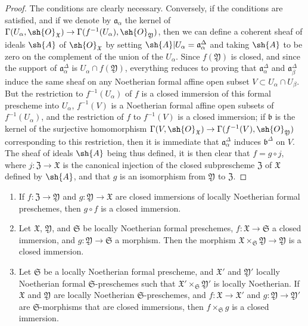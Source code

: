 \begin{proof}
The conditions are clearly necessary.
Conversely, if the conditions are satisfied, and if we denote by $\mathfrak{a}_\alpha$ the kernel of $\Gamma(U_\alpha,\sh{O}_\mathfrak{X})\to\Gamma(f^{-1}(U_\alpha),\sh{O}_\mathfrak{Y})$, then we can define a coherent sheaf of ideals $\sh{A}$ of $\sh{O}_\mathfrak{X}$ by setting $\sh{A}|U_\alpha=\mathfrak{a}_\alpha^\Delta$ and taking $\sh{A}$ to be zero on the complement of the union of the $U_\alpha$.
Since $f(\mathfrak{Y})$ is closed, and since the support of $\mathfrak{a}_\alpha^\Delta$ is $U_\alpha\cap f(\mathfrak{Y})$, everything reduces to proving that $\mathfrak{a}_\alpha^\Delta$ and $\mathfrak{a}_\beta^\Delta$ induce the same sheaf on any Noetherian formal affine open subset $V\subset U_\alpha\cap U_\beta$.
But the restriction to $f^{-1}(U_\alpha)$ of $f$ is a closed immersion of this formal prescheme into $U_\alpha$, $f^{-1}(V)$ is a Noetherian formal affine open subsets of $f^{-1}(U_\alpha)$, and the restriction of $f$ to $f^{-1}(V)$ is a closed immersion;
if $\mathfrak{b}$ is the kernel of the surjective homomorphism $\Gamma(V,\sh{O}_\mathfrak{X})\to\Gamma(f^{-1}(V),\sh{O}_\mathfrak{Y})$ corresponding to this restriction, then it is immediate  that $\mathfrak{a}_\alpha^\Delta$ induces $\mathfrak{b}^\Delta$ on $V$.
The sheaf of ideals $\sh{A}$ being thus defined, it is then clear that $f=g\circ j$, where $j:\mathfrak{Z}\to\mathfrak{X}$ is the canonical injection of the closed subprescheme $\mathfrak{Z}$ of $\mathfrak{X}$ defined by $\sh{A}$, and that $g$ is an isomorphism from $\mathfrak{Y}$ to $\mathfrak{Z}$.
\end{proof}

\begin{proposition}[10.14.5]
\label{I.10.14.5}
\medskip\noindent
\begin{enumerate}
  \item[\rm{(i)}] If $f:\mathfrak{Z}\to\mathfrak{Y}$ and $g:\mathfrak{Y}\to\mathfrak{X}$ are closed immersions of locally Noetherian formal preschemes, then $g\circ f$ is a closed immersion.
  \item[\rm{(ii)}] Let $\mathfrak{X}$, $\mathfrak{Y}$, and $\mathfrak{S}$ be locally Noetherian formal preschemes, $f:\mathfrak{X}\to\mathfrak{S}$ a closed immersion, and $g:\mathfrak{Y}\to\mathfrak{S}$ a morphism.
    Then the morphism $\mathfrak{X}\times_\mathfrak{S}\mathfrak{Y}\to\mathfrak{Y}$ is a closed immersion.
  \item[\rm{(iii)}] Let $\mathfrak{S}$ be a locally Noetherian formal prescheme, and $\mathfrak{X}'$ and $\mathfrak{Y}'$ locally Noetherian formal $\mathfrak{S}$-preschemes such that $\mathfrak{X}'\times_\mathfrak{S}\mathfrak{Y}'$ is locally Noetherian.
    If $\mathfrak{X}$ and $\mathfrak{Y}$ are locally Noetherian $\mathfrak{S}$-preschemes, and $f:\mathfrak{X}\to\mathfrak{X}'$ and $g:\mathfrak{Y}\to\mathfrak{Y}'$ are $\mathfrak{S}$-morphisms that are closed immersions, then $f\times_\mathfrak{S}g$ is a closed immersion.
\end{enumerate}
\end{proposition}

